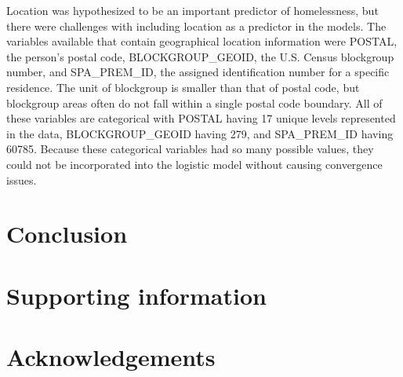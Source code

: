 \documentclass[10pt,letterpaper]{article}
\begin{document}
Location was hypothesized to be an important predictor of homelessness, but there were challenges with including location as a predictor in the models. The variables available that contain geographical location information were POSTAL, the person's postal code, BLOCKGROUP\_GEOID, the U.S. Census blockgroup number, and SPA\_PREM\_ID, the assigned identification number for a specific residence. The unit of blockgroup is smaller than that of postal code, but blockgroup areas often do not fall within a single postal code boundary. All of these variables are categorical with POSTAL having 17 unique levels represented in the data, BLOCKGROUP\_GEOID having 279, and SPA\_PREM\_ID having 60785. Because these categorical variables had so many possible values, they could not be incorporated into the logistic model without causing convergence issues.

\section*{Conclusion}

\section*{Supporting information}


\section*{Acknowledgements}

\nolinenumbers

%
%
% 




% 

\end{document}
